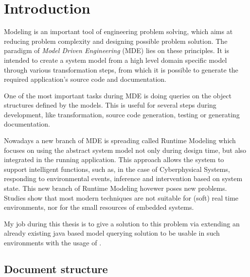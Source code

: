 \chapter*{Introduction}

Modeling is an important tool of engineering problem solving, which aims at
reducing problem complexity and designing possible problem solution. The
paradigm of \emph{Model Driven Engineering} (MDE) lies on these principles. It
is intended to create a system model from a high level domain specific model
through various transformation steps, from which it is possible to generate the
required application's source code and documentation.

One of the most important tasks during MDE is doing queries on the object
structures defined by the models. This is useful for several steps during
development, like transformation, source code generation, testing or generating
documentation.

Nowadays a new branch of MDE is spreading called Runtime Modeling which focuses
on using the abstract system model not only during design time, but also
integrated in the running application. This approach allows the system to
support intelligent functions, such as, in the case of Cyberphysical Systems,
responding to environmental events, inference and intervention based on system
state. This new branch of Runtime Modeling hovewer poses new problems. Studies show
that most modern techniques are not suitable for (soft) real time environments,
nor for the small resources of embedded systems.

My job during this thesis is to give a solution to this problem via
extending an already existing java based model querying solution to be usable in
such environments with the usage of \CPP{}.



\section*{Document structure}\label{sec:DocumentStructure}

